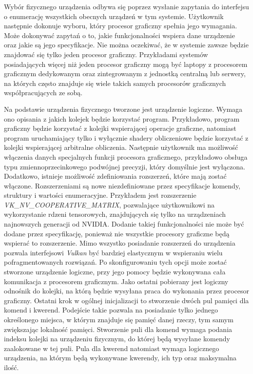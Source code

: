 Wybór fizycznego urządzenia odbywa się poprzez wysłanie zapytania do interfejsu o enumerację wszystkich obecnych urządzeń w tym systemie.
Użytkownik następnie dokonuje wyboru, który procesor graficzny spełnia jego wymagania. 
Może dokonywać zapytań o to, jakie funkcjonalności wspiera dane urządzenie oraz jakie są jego specyfikacje.
Nie można oczekiwać, że w systemie zawsze będzie znajdować się tylko jeden procesor graficzny.
Przykładami systemów posiadających więcej niż jeden procesor graficzny mogą być laptopy z procesorem graficznym dedykowanym oraz zintegrowanym z jednostką centralną lub serwery, na których często znajduje się wiele takich samych procesorów graficznych współpracujących ze sobą.

Na podstawie urządzenia fizycznego tworzone jest urządzenie logiczne.
Wymaga ono opisania z jakich kolejek będzie korzystać program.
Przykładowo, program graficzny będzie korzystać z kolejki wspierającej operacje graficzne, natomiast program uruchamiający tylko i wyłącznie shadery obliczeniowe będzie korzystać z kolejki wspierającej arbitralne obliczenia.
Następnie użytkownik ma możliwość włączenia danych specjalnych funkcji procesora graficznego, przykładowo obsługa typu zmiennoprzecinkowego podwójnej precyzji, który domyślnie jest wyłączona.
Dodatkowo, istnieje możliwość zdefiniowania rozszerzeń, które mają zostać włączone.
Rozszerzeniami są nowe niezdefiniowane przez specyfikacje komendy, struktury i wartości enumeracyjne.
Przykładem jest rozszerzenie \textit{VK\_NV\_COOPERATIVE\_MATRIX}, pozwalające użytkownikowi na wykorzystanie rdzeni tensorowych, znajdujących się tylko na urządzeniach najnowszych generacji od NVIDIA.
Dodanie takiej funkcjonalności nie może być dodane przez specyfikację, ponieważ nie wszystkie procesory graficzne będą wspierać to rozszerzenie.
Mimo wszystko posiadanie rozszerzeń do urządzenia pozwala interfejsowi \textit{Vulkan} być bardziej elastycznym w wspieraniu wielu pofragmentowanych rozwiązań.
Po skonfigurowaniu tych opcji może zostać stworzone urządzenie logiczne, przy jego pomocy będzie wykonywana cała komunikacja z procesorem graficznym.
Jako ostatni pobierany jest logiczny odnośnik do kolejki, na którą będzie wysyłana praca do wykonania przez procesor graficzny. 
Ostatni krok w ogólnej inicjalizacji to stworzenie dwóch pul pamięci dla komend i kwerend.
Podejście takie pozwala na posiadanie tylko jednego określonego miejsca, w którym znajduje się pamięć danej rzeczy, tym samym zwiększając lokalność pamięci.
Stworzenie puli dla komend wymaga podania indeksu kolejki na urządzeniu fizycznym, do której będą wysyłane komendy zaalokowane w tej puli.
Pula dla kwerend natomiast wymaga logicznego urządzenia, na którym będą wykonywane kwerendy, ich typ oraz maksymalna ilość.

